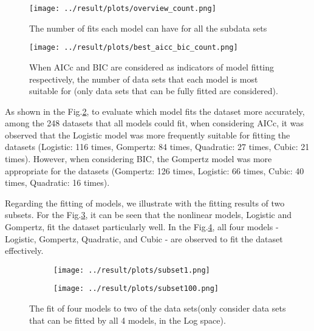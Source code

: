 \documentclass[11pt]{article}
\begin{document}
\begin{linenumbers}
         \begin{figure}[ht!]
            \centering
            \texttt{[image: ../result/plots/overview\_count.png]}
            \caption{The number of fits each model can have for all the subdata sets}
            \label{fig:overview_count}
        \end{figure}
        
         \begin{figure}[ht!]
            \centering
            \texttt{[image: ../result/plots/best\_aicc\_bic\_count.png]}
            \caption{When AICc and BIC are considered as indicators of model fitting respectively, the number of data sets that each model is most suitable for (only data sets that can be fully fitted are considered).}
            \label{fig:best_aicc_bic_count}
        \end{figure}
        As shown in the Fig.\ref{fig:best_aicc_bic_count}, to evaluate which model fits the dataset more accurately, among the 248 datasets that all models could fit, when considering AICc, it was observed that the Logistic model was more frequently suitable for fitting the datasets (Logistic: 116 times, Gompertz: 84 times, Quadratic: 27 times, Cubic: 21 times). However, when considering BIC, the Gompertz model was more appropriate for the datasets (Gompertz: 126 times, Logistic: 66 times, Cubic: 40 times, Quadratic: 16 times).


        Regarding the fitting of models, we illustrate with the fitting results of two subsets. For the Fig.\ref{fig:dataset1.png}, it can be seen that the nonlinear models, Logistic and Gompertz, fit the dataset particularly well. In the Fig.\ref{fig:dataset100.png}, all four models - Logistic, Gompertz, Quadratic, and Cubic - are observed to fit the dataset effectively.
            \begin{figure}[h]
            \centering
            \begin{subfigure}[a]{0.45\textwidth}
                \centering
                \texttt{[image: ../result/plots/subset1.png]}
                \caption{}
                \label{fig:dataset1.png}
            \end{subfigure}
            \hfill
            \begin{subfigure}[a]{0.45\textwidth}
                \centering
                \texttt{[image: ../result/plots/subset100.png]}
                \caption{}
                \label{fig:dataset100.png}
            \end{subfigure}
            \caption{The fit of four models to two of the data sets(only consider data sets that can be fitted by all 4 models, in the Log space).}
            \label{fig:both growth plots}
        \end{figure}
        

\end{linenumbers}
\end{document}
